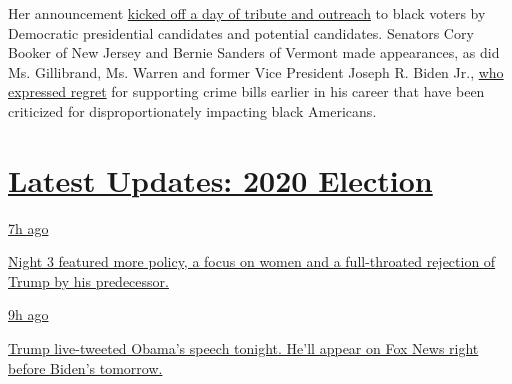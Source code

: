 Her announcement
\href{https://www.nytimes3xbfgragh.onion/2019/01/21/us/politics/biden-crime-bill-regrets.html?action=click\&module=Top\%20Stories\&pgtype=Homepage}{kicked
off a day of tribute and outreach} to black voters by Democratic
presidential candidates and potential candidates. Senators Cory Booker
of New Jersey and Bernie Sanders of Vermont made appearances, as did Ms.
Gillibrand, Ms. Warren and former Vice President Joseph R. Biden Jr.,
\href{https://www.nytimes3xbfgragh.onion/2019/01/21/us/politics/biden-crime-bill-regrets.html}{who
expressed regret} for supporting crime bills earlier in his career that
have been criticized for disproportionately impacting black Americans.

\hypertarget{latest-updates-2020-election}{%
\section{\texorpdfstring{\href{https://www.nytimes3xbfgragh.onion/live/2020/08/19/us/dnc-convention-election?action=click\&pgtype=Article\&state=default\&region=MAIN_CONTENT_1\&context=storylines_live_updates}{Latest
Updates: 2020
Election}}{Latest Updates: 2020 Election}}\label{latest-updates-2020-election}}

\href{https://www.nytimes3xbfgragh.onion/live/2020/08/19/us/dnc-convention-election?action=click\&pgtype=Article\&state=default\&region=MAIN_CONTENT_1\&context=storylines_live_updates\#night-3-featured-more-policy-a-focus-on-women-and-a-full-throated-rejection-of-trump-by-his-predecessor}{7h
ago}

\href{https://www.nytimes3xbfgragh.onion/live/2020/08/19/us/dnc-convention-election?action=click\&pgtype=Article\&state=default\&region=MAIN_CONTENT_1\&context=storylines_live_updates\#night-3-featured-more-policy-a-focus-on-women-and-a-full-throated-rejection-of-trump-by-his-predecessor}{Night
3 featured more policy, a focus on women and a full-throated rejection
of Trump by his predecessor.}

\href{https://www.nytimes3xbfgragh.onion/live/2020/08/19/us/dnc-convention-election?action=click\&pgtype=Article\&state=default\&region=MAIN_CONTENT_1\&context=storylines_live_updates\#trump-live-tweeted-obamas-speech-tonight-hell-appear-on-fox-news-right-before-bidens-tomorrow}{9h
ago}

\href{https://www.nytimes3xbfgragh.onion/live/2020/08/19/us/dnc-convention-election?action=click\&pgtype=Article\&state=default\&region=MAIN_CONTENT_1\&context=storylines_live_updates\#trump-live-tweeted-obamas-speech-tonight-hell-appear-on-fox-news-right-before-bidens-tomorrow}{Trump
live-tweeted Obama's speech tonight. He'll appear on Fox News right
before Biden's tomorrow.}


